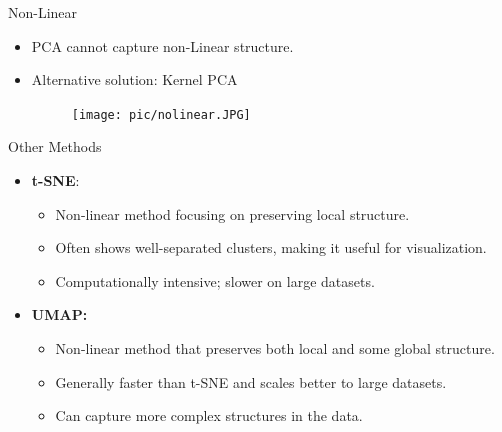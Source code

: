 \documentclass[serif, aspectratio=169]{beamer}
\begin{document}
\begin{frame}{Non-Linear}
    \begin{itemize}
        \item PCA cannot capture non-Linear structure.
        \item Alternative solution: Kernel PCA
        \begin{figure}[htpb]
            \begin{center}
                \texttt{[image: pic/nolinear.JPG]}
            \end{center}
        \end{figure}
    \end{itemize}
\end{frame}


\begin{frame}{Other Methods}
    \begin{itemize}
        \item \textbf{t-SNE}:
        \begin{itemize}
            \item Non-linear method focusing on preserving local structure.
            \item Often shows well-separated clusters, making it useful for visualization.
            \item Computationally intensive; slower on large datasets.
        \end{itemize}
        \item \textbf{UMAP:}
        \begin{itemize}
            \item Non-linear method that preserves both local and some global structure.
            \item Generally faster than t-SNE and scales better to large datasets.
            \item Can capture more complex structures in the data.
        \end{itemize}
    \end{itemize}
\end{frame}
\end{document}
